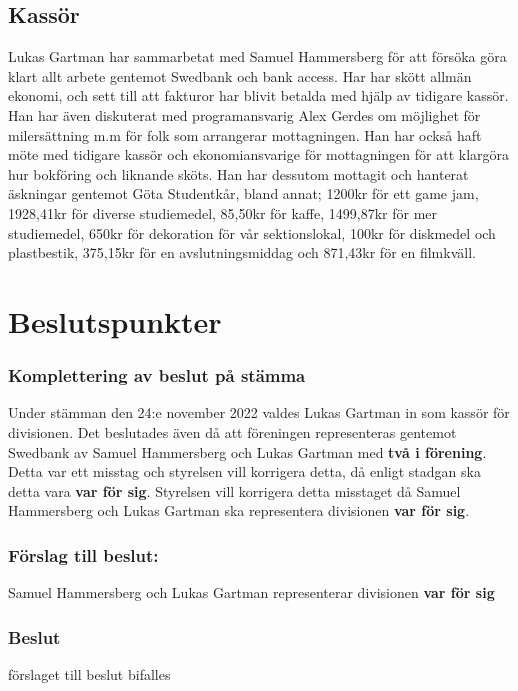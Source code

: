 \documentclass[protokoll]{dvd}
\begin{document}
\subsection{Kassör}
Lukas Gartman har sammarbetat med Samuel Hammersberg för att försöka göra klart allt arbete gentemot Swedbank och bank access.
Har har skött allmän ekonomi, och sett till att fakturor har blivit betalda med hjälp av tidigare kassör.
Han har även diskuterat med programansvarig Alex Gerdes om möjlighet för milersättning m.m för folk som arrangerar mottagningen.
Han har också haft möte med tidigare kassör och ekonomiansvarige för mottagningen för att klargöra hur bokföring och liknande sköts. 
Han har dessutom mottagit och hanterat äskningar gentemot Göta Studentkår, bland annat; 
1200kr för ett game jam, 1928,41kr för diverse studiemedel, 85,50kr för kaffe, 1499,87kr för mer studiemedel, 
650kr för dekoration för vår sektionslokal, 100kr för diskmedel och plastbestik, 375,15kr för en avslutningsmiddag och 871,43kr för en filmkväll.

\newpage

\section{Beslutspunkter}

\subsubsection*{Komplettering av beslut på stämma}
Under stämman den 24:e november 2022 valdes Lukas Gartman in som kassör för divisionen.
Det beslutades även då att föreningen representeras gentemot Swedbank av Samuel Hammersberg och Lukas Gartman med \textbf{två i förening}.
Detta var ett misstag och styrelsen vill korrigera detta, då enligt stadgan ska detta vara \textbf{var för sig}.
Styrelsen vill korrigera detta misstaget då Samuel Hammersberg och Lukas Gartman ska representera divisionen
\textbf{var för sig}.

\subsubsection*{Förslag till beslut:}
\begin{attsatser}
    \item Samuel Hammersberg och Lukas Gartman representerar divisionen \textbf{var för sig}
\end{attsatser}

\subsubsection*{Beslut}
\begin{attsatser}
    \item förslaget till beslut bifalles
\end{attsatser}
\end{document}
